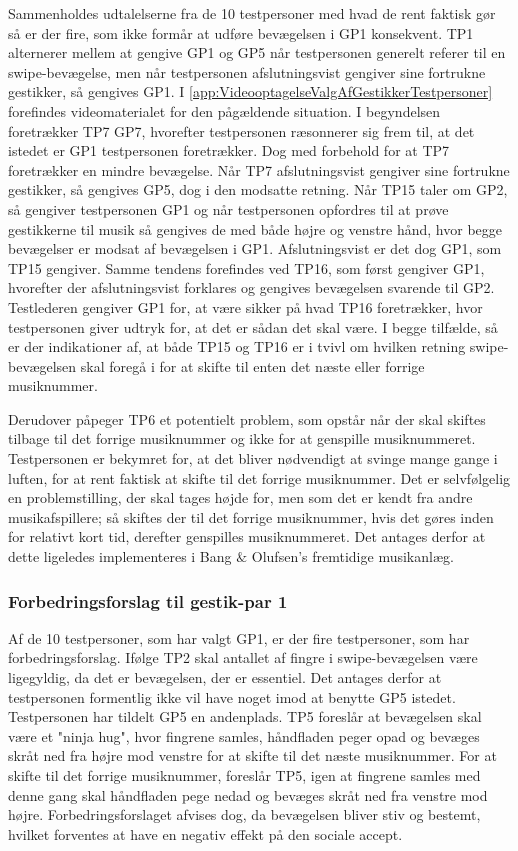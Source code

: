 Sammenholdes udtalelserne fra de 10 testpersoner med hvad de rent faktisk gør så er der fire, som ikke formår at udføre bevægelsen i GP1 konsekvent. TP1 alternerer mellem at gengive GP1 og GP5 når testpersonen generelt referer til en swipe-bevægelse, men når testpersonen afslutningsvist gengiver sine fortrukne gestikker, så gengives GP1. I \autoref{app:VideooptagelseValgAfGestikkerTestpersoner} forefindes videomaterialet for den pågældende situation. I begyndelsen foretrækker TP7 GP7, hvorefter testpersonen ræsonnerer sig frem til, at det istedet er GP1 testpersonen foretrækker. Dog med forbehold for at TP7 foretrækker en mindre bevægelse. Når TP7 afslutningsvist gengiver sine fortrukne gestikker, så gengives GP5, dog i den modsatte retning. Når TP15 taler om GP2, så gengiver testpersonen GP1 og når testpersonen opfordres til at prøve gestikkerne til musik så gengives de med både højre og venstre hånd, hvor begge bevægelser er modsat af bevægelsen i GP1. Afslutningsvist er det dog GP1, som TP15 gengiver. Samme tendens forefindes ved TP16, som først gengiver GP1, hvorefter der afslutningsvist forklares og gengives bevægelsen svarende til GP2. Testlederen gengiver GP1 for, at være sikker på hvad TP16 foretrækker, hvor testpersonen giver udtryk for, at det er sådan det skal være. I begge tilfælde, så er der indikationer af, at både TP15 og TP16 er i tvivl om hvilken retning swipe-bevægelsen skal foregå i for at skifte til enten det næste eller forrige musiknummer.

Derudover påpeger TP6 et potentielt problem, som opstår når der skal skiftes tilbage til det forrige musiknummer og ikke for at genspille musiknummeret. Testpersonen er bekymret for, at det bliver nødvendigt at svinge mange gange i luften, for at rent faktisk at skifte til det forrige musiknummer. Det er selvfølgelig en problemstilling, der skal tages højde for, men som det er kendt fra andre musikafspillere; så skiftes der til det forrige musiknummer, hvis det gøres inden for relativt kort tid, derefter genspilles musiknummeret. Det antages derfor at dette ligeledes implementeres i Bang $\&$ Olufsen's fremtidige musikanlæg. 
%
\subsubsection{Forbedringsforslag til gestik-par 1}
\label{TestresultaterValgAfGestikkerForbedringGP1Skift}
%
Af de 10 testpersoner, som har valgt GP1, er der fire testpersoner, som har forbedringsforslag. Ifølge TP2 skal antallet af fingre i swipe-bevægelsen være ligegyldig, da det er bevægelsen, der er essentiel. Det antages derfor at testpersonen formentlig ikke vil have noget imod at benytte GP5 istedet. Testpersonen har tildelt GP5 en andenplads. TP5 foreslår at bevægelsen skal være et "ninja hug", hvor fingrene samles, håndfladen peger opad og bevæges skråt ned fra højre mod venstre for at skifte til det næste musiknummer. For at skifte til det forrige musiknummer, foreslår TP5, igen at fingrene samles med denne gang skal håndfladen pege nedad og bevæges skråt ned fra venstre mod højre. Forbedringsforslaget afvises dog, da bevægelsen bliver stiv og bestemt, hvilket forventes at have en negativ effekt på den sociale accept.

